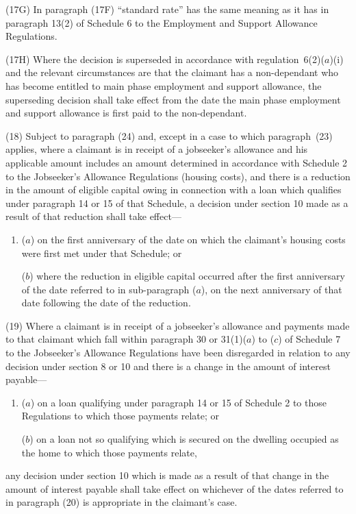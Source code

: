 \documentclass[12pt,a4paper]{article}
\begin{document}
(17G) In paragraph (17F) “standard rate” has the same meaning as it has in paragraph 13(2) of Schedule 6 to the Employment and Support Allowance Regulations.

\begin{sloppypar}
(17H) Where the decision is superseded in accordance with regulation~6(2)($a$)(i)  and the relevant circumstances are that the claimant has a non-dependant who has become entitled to main phase employment and support allowance, the superseding decision shall take effect from the date the main phase employment and support allowance is first paid to the non-dependant.
\end{sloppypar}

(18) Subject to paragraph (24) and, except in a case to which paragraph~(23) applies, where a claimant is in receipt of a jobseeker’s allowance and his applicable amount includes an amount determined in accordance with Schedule 2 to the Jobseeker’s Allowance Regulations (housing costs), and there is a reduction in the amount of eligible capital owing in connection with a loan which qualifies under paragraph 14 or 15 of that Schedule, a decision under section 10 made as a result of that reduction shall take effect—
\begin{enumerate}\item[]
($a$) on the first anniversary of the date on which the claimant’s housing costs were first met under that Schedule; or

($b$) where the reduction in eligible capital occurred after the first anniversary of the date referred to in sub-paragraph ($a$), on the next anniversary of that date following the date of the reduction.
\end{enumerate}

(19) Where a claimant is in receipt of a jobseeker’s allowance and payments made to that claimant which fall within paragraph 30 or 31(1)($a$) to ($c$) of Schedule 7 to the Jobseeker’s Allowance Regulations have been disregarded in relation to any decision under section 8 or 10 and there is a change in the amount of interest payable—
\begin{enumerate}\item[]
($a$) on a loan qualifying under paragraph 14 or 15 of Schedule 2 to those Regulations to which those payments relate; or

($b$) on a loan not so qualifying which is secured on the dwelling occupied as the home to which those payments relate,
\end{enumerate}
any decision under section 10 which is made as a result of that change in the amount of interest payable shall take effect on whichever of the dates referred to in paragraph (20) is appropriate in the claimant’s case.
\end{document}
